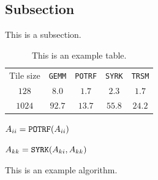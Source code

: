       \subsection{Subsection}
      \label{intro.section.subsection}

      This is a subsection.

              \begin{table}
        \centering
        \caption{This is an example table.} 	
        \begin{tabular}{c c c c c}
         \toprule
         Tile size & {\tt GEMM} & {\tt POTRF} & {\tt SYRK} & {\tt TRSM} \\
         \cmidrule{1-5}
         $128$ & $8.0$ & $1.7$ & $2.3$ & $1.7$ \\
         $1024$ & $92.7$ & $13.7$ & $55.8$ & $24.2$ \\             
        \bottomrule
        \end{tabular}   
        \label{intro.tb}
        \end{table}

\begin{algorithm}	
	
	{
		$A_{ii} = {\tt POTRF}(A_{ii})$
		
		
		{
			$A_{kk} = {\tt SYRK}(A_{ki}, A_{kk})$
			
		}		
	}	
	
	\caption{This is an example algorithm.}
	\label{intro.alg}
      \end{algorithm} 



